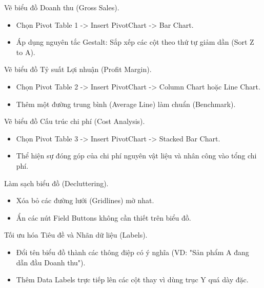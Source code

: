 \documentclass[aspectratio=169]{beamer}
\begin{document}
\begin{frame}{Vẽ biểu đồ Doanh thu (Gross Sales).}
    \begin{itemize}
        \item Chọn Pivot Table 1 -> Insert PivotChart -> Bar Chart.
        \item Áp dụng nguyên tắc Gestalt: Sắp xếp các cột theo thứ tự giảm dần (Sort Z to A).
    \end{itemize}
\end{frame}


\begin{frame}{Vẽ biểu đồ Tỷ suất Lợi nhuận (Profit Margin).}
    \begin{itemize}
        \item Chọn Pivot Table 2 -> Insert PivotChart -> Column Chart hoặc Line Chart.
        \item Thêm một đường trung bình (Average Line) làm chuẩn (Benchmark).
    \end{itemize}
\end{frame}


\begin{frame}{Vẽ biểu đồ Cấu trúc chi phí (Cost Analysis).}
    \begin{itemize}
        \item Chọn Pivot Table 3 -> Insert PivotChart -> Stacked Bar Chart.
        \item Thể hiện sự đóng góp của chi phí nguyên vật liệu và nhân công vào tổng chi phí.
    \end{itemize}
\end{frame}


\begin{frame}{Làm sạch biểu đồ (Decluttering).}
    \begin{itemize}
        \item Xóa bỏ các đường lưới (Gridlines) mờ nhat.
        \item Ẩn các nút Field Buttons không cần thiết trên biểu đồ.
    \end{itemize}
\end{frame}


\begin{frame}{Tối ưu hóa Tiêu đề và Nhãn dữ liệu (Labels).}
    \begin{itemize}
        \item Đổi tên biểu đồ thành các thông điệp có ý nghĩa (VD: "Sản phẩm A đang dẫn đầu Doanh thu").
        \item Thêm Data Labels trực tiếp lên các cột thay vì dùng trục Y quá dày đặc.
    \end{itemize}
\end{frame}
\end{document}
